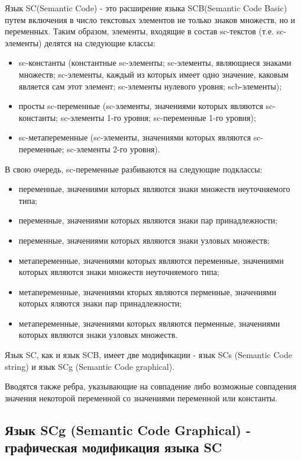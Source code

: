 Язык SC(Semantic Code) - это расширение языка SCB(Semantic Code Basic) путем включения в число текстовых элементов не только знаков множеств, но и переменных. Таким образом, элементы, входящие в состав sc-текстов (т.е. sc-элементы) делятся на следующие классы:

\begin{itemize}
\item sc-константы (константные sc-элементы; sc-элементы, являющиеся знаками множеств; sc-элементы, каждый из которых имеет одно значение, каковым является сам этот элемент; sc-элементы нулевого уровня; scb-элементы); 
\item просты sc-переменные (sc-элементы, значениями которых являются sc-константы; sc-элементы 1-го уровня; sc-переменные 1-го уровня);
\item sc-метапеременные (sc-элементы, значениями которых являются sc-переменные; sc-элементы 2-го уровня).
\end{itemize}

В свою очередь, sc-переменные разбиваются на следующие подклассы:

\begin{itemize}
\item переменные, значениями которых являются знаки множеств неуточняемого типа;
\item переменные, значениями которых являются знаки пар принадлежности;
\item переменные, значениями которых являются знаки узловых множеств;
\item метапеременные, значениями которых являются переменные, значениями которых являются знаки множеств неуточняемого типа;
\item метапеременные, значениями кторых являются перменные, значениями которых яляются знаки пар принадлежности;
\item метапеременные, значениями которых являются перменные, значениями которых являются знаки узловых множеств.
\end{itemize}

Язык SC, как и язык SCB, имеет две модификации - язык SCs (Semantic Code string) и язык SCg (Semantic Code graphical).

Вводятся также ребра, указывающие на совпадение либо возможные совпадения значения некоторой переменной со значениями переменной или константы.

\subsection{Язык SCg (Semantic Code Graphical) - графическая модификация языка SC}

